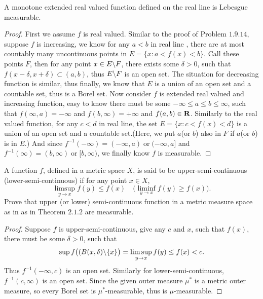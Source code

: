 \begin{pro}%
	A monotone extended real valued function defined on the real line is Lebesgue measurable.
\end{pro}
\begin{proof}
	First we assume $f$ is real valued. Similar to the proof of Problem $1.9.14$, suppose $f$ is increasing, we know for any $a<b$ in real line , there are at most countably many uncontinuous points in $E=\{x\colon a<f(x)<b\}$. Call these points $F$, then for any point $x\in E\backslash F$, there exists some $\delta>0$, such that $f(x-\delta,x+\delta)\subset(a,b)$, thus $E\backslash F$ is an open set. The situation for decreasing function is similar, thus finally, we know that $E$ is a union of an open set and a countable set, thus is a Borel set.
	Now consider $f$ is extended real valued and increasing function, easy to know there must be some $-\infty\leq a\leq b\leq \infty$, such that
	$f(\infty,a)=-\infty$ and $f(b,\infty)=+\infty$ and $f(a,b)\in\mathbf{R}$. Similarly to the real valued function, for any $c<d$ in real line, the set $E=\{x\colon c<f(x)<d\}$ is a union of an open set and a countable set.(Here, we put $a$(or $b$) also in $F$ if $a$(or $b$) is in $E$.) And since $f^{-1}(-\infty)=(-\infty,a)\;\mbox{or}\;(-\infty,a]$ and $f^{-1}(\infty)=(b,\infty)\;\mbox{or}\;[b,\infty)$, we finally know $f$ is measurable.
\end{proof}

\begin{pro}%
	A function $f$, defined in a metric space $X$, is said to be upper-semi-continuous (lower-semi-continuous) if for any point $x\in X$,
	\[\limsup_{y\to x} f(y)\leq f(x)\quad\bigg(\liminf_{y\to x} f(y)\geq f(x)\bigg).\]
	Prove that upper (or lower) semi-continuous function in a metric measure space as in as in Theorem $2.1.2$ are measurable.
\end{pro}
\begin{proof}
	Suppose $f$ is upper-semi-continuous, give any $c$ and $x$, such that $f(x)$, there must be some $\delta>0$, such that
	\[\sup f\big((B(x,\delta)\backslash \{x\}\big)=\limsup_{y\to x} f(y)\leq f(x)<c.\]
	Thus $f^{-1}(-\infty,c)$ is an open set. Similarly for lower-semi-continuous, $f^{-1}(c,\infty)$ is an open set.
	Since the given outer measure $\mu^*$ is a metric outer measure, so every Borel set is $\mu^*$-measurable, thus is $\mu$-measurable.
\end{proof}

